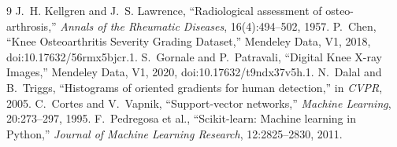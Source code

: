 \documentclass[11pt,a4paper]{article}
\begin{document}
\begin{thebibliography}{9}
 J.~H. Kellgren and J.~S. Lawrence, ``Radiological assessment of osteo-arthrosis,''
\textit{Annals of the Rheumatic Diseases}, 16(4):494--502, 1957.
 P.~Chen, ``Knee Osteoarthritis Severity Grading Dataset,'' Mendeley Data, V1, 2018,
doi:10.17632/56rmx5bjcr.1.
 S.~Gornale and P.~Patravali, ``Digital Knee X-ray Images,'' Mendeley Data, V1, 2020,
doi:10.17632/t9ndx37v5h.1.
 N.~Dalal and B.~Triggs, ``Histograms of oriented gradients for human detection,''
in \textit{CVPR}, 2005.
 C.~Cortes and V.~Vapnik, ``Support-vector networks,'' \textit{Machine Learning}, 20:273--297, 1995.
 F.~Pedregosa et al., ``Scikit-learn: Machine learning in Python,''
\textit{Journal of Machine Learning Research}, 12:2825--2830, 2011.
\end{thebibliography}
\end{document}
